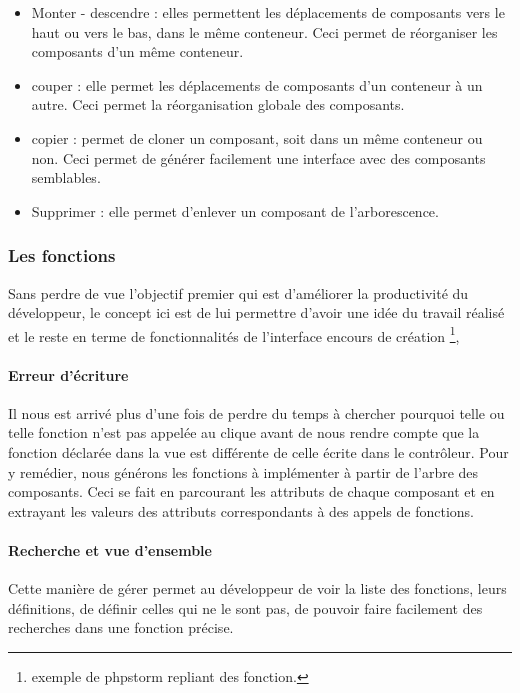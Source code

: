 \documentclass[a4paper,12pt]{article}
\begin{document}
\begin{itemize}
\item Monter - descendre : elles permettent les déplacements de
  composants vers le haut ou vers le bas, dans le même conteneur. Ceci
  permet de réorganiser les composants d'un même conteneur.

\item couper : elle permet les déplacements de composants d'un
  conteneur à un autre. Ceci permet la réorganisation globale des
  composants.
\item copier : permet de cloner
 un composant, soit dans un même
  conteneur ou non. Ceci permet de générer facilement une interface avec
  des composants semblables.
\item Supprimer : elle permet d'enlever un composant de l'arborescence.
\end{itemize}

	

\subsubsection{ Les fonctions}
Sans perdre de vue l'objectif premier qui est d'améliorer la
productivité du développeur, le concept ici est de lui permettre
d'avoir une idée du travail réalisé et le reste en terme de
fonctionnalités de l'interface encours de création \footnote{exemple
  de phpstorm repliant des fonction.},
\paragraph{Erreur d'écriture}
 Il nous est arrivé plus d'une fois de perdre du temps à chercher
 pourquoi telle ou telle fonction n'est pas appelée au clique avant de
 nous rendre compte que la fonction déclarée dans la vue est
 différente de celle écrite dans le contrôleur. Pour y remédier, nous
 générons les fonctions à implémenter à partir de l'arbre des
 composants. Ceci se fait en parcourant les attributs de chaque
 composant et en extrayant les valeurs des attributs correspondants à
 des appels de fonctions.
\paragraph{Recherche et vue d'ensemble}
Cette manière de gérer permet au développeur de voir la liste des
fonctions, leurs définitions, de définir celles qui ne le sont pas, de
pouvoir faire facilement des recherches dans une fonction précise.
\end{document}
